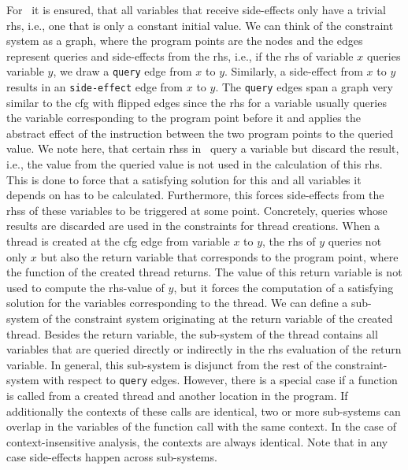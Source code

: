   For \gob\ it is ensured, that all variables that receive side-effects only have a trivial \ac{rhs}, i.e., one that is only a constant initial value.
  We can think of the constraint system as a graph, where the program points are the nodes and the edges represent queries and side-effects from the \ac{rhs}, i.e., if the \ac{rhs} of variable $x$ queries variable $y$, we draw a \texttt{query} edge from $x$ to $y$. Similarly, a side-effect from $x$ to $y$ results in an \texttt{side-effect} edge from $x$ to $y$. The \texttt{query} edges span a graph very similar to the \ac{cfg} with flipped edges since the \ac{rhs} for a variable usually queries the variable corresponding to the program point before it and applies the abstract effect of the instruction between the two program points to the queried value.
  We note here, that certain \acp{rhs} in \gob\ query a variable but discard the result, i.e., the value from the queried value is not used in the calculation of this \ac{rhs}. This is done to force that a satisfying solution for this and all variables it depends on has to be calculated. Furthermore, this forces side-effects from the \acp{rhs} of these variables to be triggered at some point. Concretely, queries whose results are discarded are used in the constraints for thread creations. When a thread is created at the \ac{cfg} edge from variable $x$ to $y$, the \ac{rhs} of $y$ queries not only $x$ but also the return variable that corresponds to the program point, where the function of the created thread returns. The value of this return variable is not used to compute the \ac{rhs}-value of $y$, but it forces the computation of a satisfying solution for the variables corresponding to the thread.
  We can define a sub-system of the constraint system originating at the return variable of the created thread. Besides the return variable, the sub-system of the thread contains all variables that are queried directly or indirectly in the \ac{rhs} evaluation of the return variable. In general, this sub-system is disjunct from the rest of the constraint-system with respect to \texttt{query} edges. However, there is a special case if a function is called from a created thread and another location in the program. If additionally the contexts of these calls are identical, two or more sub-systems can overlap in the variables of the function call with the same context. In the case of context-insensitive analysis, the contexts are always identical. Note that in any case side-effects happen across sub-systems.


